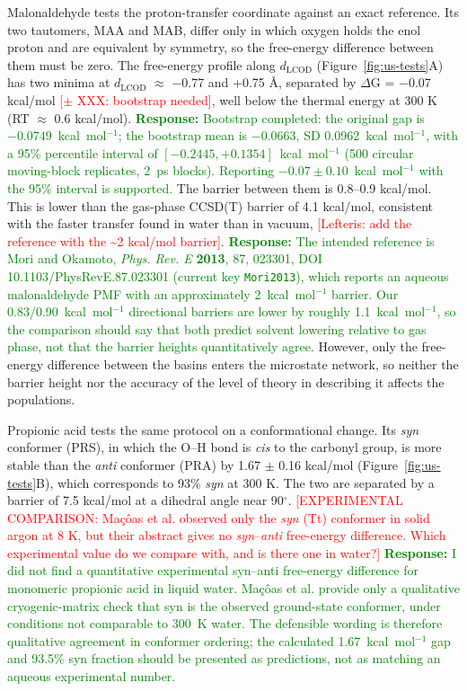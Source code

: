 Malonaldehyde tests the proton-transfer coordinate against an exact reference.
Its two tautomers, MAA and MAB, differ only in which oxygen holds the enol proton and are equivalent by symmetry, so the free-energy difference between them must be zero.
The free-energy profile along $d_{\mathrm{LCOD}}$ (Figure~\ref{fig:us-tests}A) has two minima at $d_{\mathrm{LCOD}}$ $\approx$ $-$0.77 and +0.75 Å, separated by $\Delta$G = $-$0.07 kcal/mol \textcolor{red}{[$\pm$ XXX: bootstrap needed]}, well below the thermal energy at 300 K (RT $\approx$ 0.6 kcal/mol).
\textcolor{green}{\textbf{Response:} Bootstrap completed: the original gap is $-0.0749$~kcal~mol$^{-1}$; the bootstrap mean is $-0.0663$, SD 0.0962~kcal~mol$^{-1}$, with a 95\% percentile interval of $[-0.2445,+0.1354]$~kcal~mol$^{-1}$ (500 circular moving-block replicates, 2~ps blocks). Reporting $-0.07\pm0.10$~kcal~mol$^{-1}$ with the 95\% interval is supported.}
The barrier between them is 0.8--0.9 kcal/mol.
This is lower than the gas-phase CCSD(T) barrier of 4.1 kcal/mol,\cite{wangFulldimensionalQuantumCalculations2008} consistent with the faster transfer found in water than in vacuum,\cite{yamadaMolecularDynamicsStudy2014} \textcolor{red}{[Lefteris: add the reference with the \textasciitilde2 kcal/mol barrier]}.
\textcolor{green}{\textbf{Response:} The intended reference is Mori and Okamoto, \emph{Phys. Rev. E} \textbf{2013}, 87, 023301, DOI 10.1103/PhysRevE.87.023301 (current key \texttt{Mori2013}), which reports an aqueous malonaldehyde PMF with an approximately 2~kcal~mol$^{-1}$ barrier. Our 0.83/0.90~kcal~mol$^{-1}$ directional barriers are lower by roughly 1.1~kcal~mol$^{-1}$, so the comparison should say that both predict solvent lowering relative to gas phase, not that the barrier heights quantitatively agree.}
However, only the free-energy difference between the basins enters the microstate network, so neither the barrier height nor the accuracy of the level of theory in describing it affects the populations.

Propionic acid tests the same protocol on a conformational change.
Its \emph{syn} conformer (PRS), in which the O--H bond is \emph{cis} to the carbonyl group, is more stable than the \emph{anti} conformer (PRA) by 1.67 $\pm$ 0.16 kcal/mol (Figure~\ref{fig:us-tests}B), which corresponds to 93\% \emph{syn} at 300 K.
The two are separated by a barrier of 7.5 kcal/mol at a dihedral angle near 90$^\circ$. \textcolor{red}{[EXPERIMENTAL COMPARISON: Ma\c{c}\^{o}as et al.\cite{macoas_internal_2005} observed only the \emph{syn} (Tt) conformer in solid argon at 8 K, but their abstract gives no \emph{syn}--\emph{anti} free-energy difference.
Which experimental value do we compare with, and is there one in water?]}
\textcolor{green}{\textbf{Response:} I did not find a quantitative experimental syn--anti free-energy difference for monomeric propionic acid in liquid water. Ma\c{c}\^{o}as et al. provide only a qualitative cryogenic-matrix check that syn is the observed ground-state conformer, under conditions not comparable to 300~K water. The defensible wording is therefore qualitative agreement in conformer ordering; the calculated 1.67~kcal~mol$^{-1}$ gap and 93.5\% syn fraction should be presented as predictions, not as matching an aqueous experimental number.}

